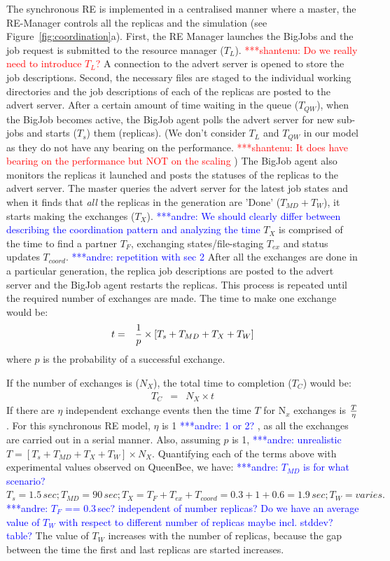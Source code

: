\documentclass{rspublic}
\newcommand{\jhanote}[1]{ {\textcolor{red} { ***shantenu: #1 }}}
\newcommand{\alnote}[1]{ {\textcolor{blue} { ***andre: #1 }}}
\newcommand{\alnote}[1]{}
\newcommand{\jhanote}[1]{}
\begin{document}
The synchronous RE is implemented in a centralised manner where a
master, the RE-Manager controls all the replicas and the simulation
(see Figure~\ref{fig:coordination}a).  First, the RE Manager launches
the BigJobs and the job request is submitted to the resource manager
($T_{L}$). \jhanote{Do we really need to introduce $T_{L}$?} A
connection to the advert server is opened to store the job
descriptions. Second, the necessary files are staged to the individual
working directories and the job descriptions of each of the replicas
are posted to the advert server.  After a certain amount of time
waiting in the queue ($T_{QW}$), when the BigJob becomes active, the
BigJob agent polls the advert server for new sub-jobs and starts
($T_{s}$) them (replicas). (We don't consider $T_{L}$ and $T_{QW}$ in
our model as they do not have any bearing on the
performance. \jhanote{It does have bearing on the performance but NOT
  on the scaling}) The BigJob agent also monitors the replicas it
launched and posts the statuses of the replicas to the advert
server. The master queries the advert server for the latest job states
and when it finds that \emph{all} the replicas in the generation are
'Done' ($T_{MD}+T_{W}$), it starts making the exchanges ($T_{X}$).
\alnote{We should clearly differ between describing the coordination
  pattern and analyzing the time} $T_{X}$ is comprised of the time to
find a partner $T_{F}$, exchanging states/file-staging $T_{ex}$ and
status updates $T_{coord}$. \alnote{repetition with sec 2} After all
the exchanges are done in a particular generation, the replica job
descriptions are posted to the advert server and the BigJob agent
restarts the replicas. This process is repeated until the required
number of exchanges are made. The time to make one exchange would be:
\begin{eqnarray}
t &=&  {1 \over p} \times {[T_s+T_{MD} + T_{X} + T_{W}]} 
\label{eq:sy}
\end{eqnarray}
where $p$ is the probability of a successful exchange.

If the number of exchanges is ($N_{X}$), the total time to completion ($T_{C}$) would be:
\begin{eqnarray}
T_{C} &=& N_{X} \times t 
\label{eq:synch}
\end{eqnarray}
If there are $\eta$ independent exchange events then the time $T$ for 
N$_x$ exchanges is $T \over \eta$. For this synchronous RE model, 
$\eta$ is 1\alnote{1 or 2?}, as all the exchanges are carried out 
in a serial manner. Also, assuming $p$ is 1,\alnote{unrealistic} 
$T =  [T_s+T_{MD} + T_{X} + T_{W}] \times N_{X}$.
Quantifying each of the terms above with experimental values observed 
on QueenBee, we have:
\alnote{$T_{MD}$ is for what scenario?}
$T_s = 1.5\,sec; T_{MD}=90\,sec; T_{X}=T_{F}+T_{ex}+T_{coord}=0.3+1+0.6=1.9\,sec; T_W=varies.$ 
\alnote{$T_{F}$ == 0.3\,sec? independent of number replicas? 
Do we have an average value of $T_{W}$ with respect to different
number of replicas maybe incl. stddev? table?}
The value of $T_W$ increases with the number of replicas, because 
the gap between the time the first and last replicas are 
started increases. 
\end{document}
